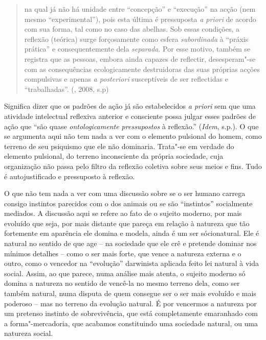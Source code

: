 \begin{quote}
na qual já não há unidade entre ``concepção'' e ``execução'' na acção
(nem mesmo ``experimental''), pois esta última é pressuposta \emph{a
priori} de acordo com sua forma, tal como no caso das abelhas. Sob essas
condições, a reflexão (teórica) surge forçosamente como esfera
\emph{subordinada} à ``práxis prática'' e consequentemente dela
\emph{separada}. Por esse motivo, também se registra que as pessoas,
embora ainda capazes de reflectir, desesperam"-se com as consequências
ecologicamente destruidoras das suas próprias acções compulsivas e
apenas \emph{a posteriori} susceptíveis de ser reflectidas e
``trabalhadas''. (, 2008, s.p)
\end{quote}

Significa dizer que os padrões de ação já são estabelecidos \emph{a
priori} sem que uma atividade intelectual reflexiva anterior e consciente
possa julgar esses padrões de ação que ``são quase \emph{ontologicamente
pressupostos} à reflexão.'' (\emph{Idem}, s.p.). O que se argumenta aqui
não tem nada a ver com o elemento pulsional do homem, como terreno de
seu psiquismo que ele não dominaria. Trata"-se em verdade do elemento
pulsional, do terreno inconsciente da própria sociedade, cuja
organização não passa pelo filtro da reflexão coletiva sobre seus meios
e fins. Tudo é autojustificado e pressuposto à reflexão.

O que não tem nada a ver com uma discussão sobre se o ser humano carrega
consigo instintos parecidos com o dos animais ou se são ``instintos''
socialmente mediados. A discussão aqui se refere ao fato de o sujeito
moderno, por mais evoluído que seja, por mais distante que pareça em
relação à natureza que tão fortemente em aparência ele domina e modela,
ainda é um ser sócionatural. Ele é natural no sentido de que age -- na
sociedade que ele crê e pretende dominar nos mínimos detalhes -- como o
ser mais forte, que vence a natureza externa e o outro, como o vencedor
na ``evolução'' darwinista aplicada feito lei natural à vida social.
Assim, ao que parece, numa análise mais atenta, o sujeito moderno só
domina a natureza no sentido de vencê-la no mesmo terreno dela, como ser
também natural, numa disputa de quem consegue ser o ser mais evoluído e
mais poderoso -- mas no terreno da evolução natural. É por vencermos a
natureza por um pretenso instinto de sobrevivência, que está
completamente emaranhado com a forma"-mercadoria, que acabamos
constituindo uma sociedade natural, ou uma natureza social.

